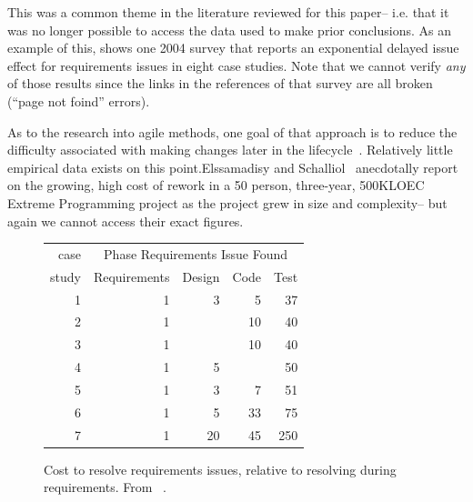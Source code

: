 This was a common theme in the literature reviewed for this paper-- i.e.  that  it was no longer possible to access
the data used to make prior conclusions.
As an example of this,  shows one 2004 survey that reports an 
exponential delayed issue  effect for 
requirements issues in eight case studies. Note that we cannot verify
{\em any} of those results since the links in the references of
that  survey are all broken (``page not foind'' errors).


As to the research into agile methods, one goal of that approach
is to reduce the difficulty associated with making changes later in the lifecycle~\cite{beck00}. Relatively little empirical data exists on this point.Elssamadisy and Schalliol~\cite{Elssamadisy02} anecdotally report on the growing, high cost of rework in a 50 person, three-year, 500KLOEC Extreme Programming project as the project grew in size and complexity-- but again we cannot access their 
exact figures.


 


 \begin{figure}
{\small
\begin{center}
\begin{tabular}{r|rrrr}
 case& \multicolumn{4}{c}{Phase Requirements Issue Found }  \\
 study               &Requirements & Design & Code&  Test\\\hline
1& 1 &3& 5& 37\\  
2& 1  &    & 10 & 40 \\ 
3& 1   &    & 10 &  40 \\
4&  1  &   5 &      & 50  \\
5&  1 &3& 7& 51 \\
6& 1& 5 &33 &75  \\
7&  1 & 20 & 45 & 250 \\  
\end{tabular}
\end{center}}
\caption{Cost to resolve requirements issues, relative to resolving  during requirements. From ~\cite{steck04}.}\label{fig:steck}
\end{figure}


